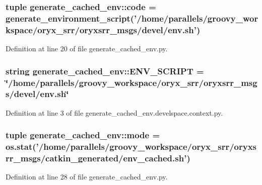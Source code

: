 \subsubsection[{code}]{\setlength{\rightskip}{0pt plus 5cm}tuple {\bf generate\-\_\-cached\-\_\-env\-::code} = generate\-\_\-environment\-\_\-script('/home/parallels/groovy\-\_\-workspace/oryx\-\_\-srr/oryxsrr\-\_\-msgs/devel/env.\-sh')}\label{namespacegenerate__cached__env_ac9bcc622d7ed9c3f04f958d98feb15a2}


\-Definition at line 20 of file generate\-\_\-cached\-\_\-env.\-py.

\subsubsection[{\-E\-N\-V\-\_\-\-S\-C\-R\-I\-P\-T}]{\setlength{\rightskip}{0pt plus 5cm}string {\bf generate\-\_\-cached\-\_\-env\-::\-E\-N\-V\-\_\-\-S\-C\-R\-I\-P\-T} = \char`\"{}/home/parallels/groovy\-\_\-workspace/oryx\-\_\-srr/oryxsrr\-\_\-msgs/devel/env.\-sh\char`\"{}}\label{namespacegenerate__cached__env_a47f2ffa8bf91a11f8c1a26fd677ae040}


\-Definition at line 3 of file generate\-\_\-cached\-\_\-env.\-develspace.\-context.\-py.

\subsubsection[{mode}]{\setlength{\rightskip}{0pt plus 5cm}tuple {\bf generate\-\_\-cached\-\_\-env\-::mode} = os.\-stat('/home/parallels/groovy\-\_\-workspace/oryx\-\_\-srr/oryxsrr\-\_\-msgs/catkin\-\_\-generated/env\-\_\-cached.\-sh')}\label{namespacegenerate__cached__env_a5d4820d9a2d43523818b8013aba84965}


\-Definition at line 28 of file generate\-\_\-cached\-\_\-env.\-py.

